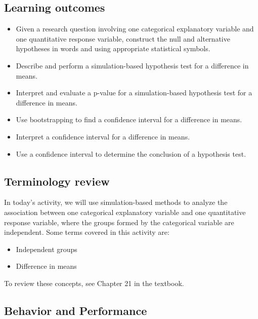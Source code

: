 \documentclass[
]{report}
\begin{document}
\hypertarget{learning-outcomes-23}{%
\subsection{Learning outcomes}\label{learning-outcomes-23}}

\begin{itemize}
\item
  Given a research question involving one categorical explanatory variable and one quantitative response variable, construct the null and alternative hypotheses
  in words and using appropriate statistical symbols.
\item
  Describe and perform a simulation-based hypothesis test for a difference in means.
\item
  Interpret and evaluate a p-value for a simulation-based hypothesis test for a difference in means.
\item
  Use bootstrapping to find a confidence interval for a difference in means.
\item
  Interpret a confidence interval for a difference in means.
\item
  Use a confidence interval to determine the conclusion of a hypothesis test.
\end{itemize}

\hypertarget{terminology-review-19}{%
\subsection{Terminology review}\label{terminology-review-19}}

In today's activity, we will use simulation-based methods to analyze the association between one categorical explanatory variable and one quantitative response variable, where the groups formed by the categorical variable are independent. Some terms covered in this activity are:

\begin{itemize}
\item
  Independent groups
\item
  Difference in means
\end{itemize}

To review these concepts, see Chapter 21 in the textbook.

\hypertarget{behavior-and-performance}{%
\subsection{Behavior and Performance}\label{behavior-and-performance}}
\end{document}
